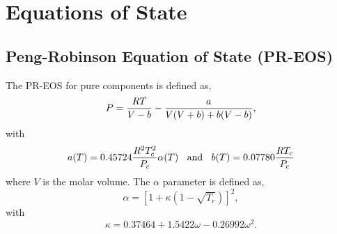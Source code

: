
\chapter{Equations of State}\label{Chapter:EOSPR}

\section{Peng-Robinson Equation of State (PR-EOS)}\label{Chapter:EOSPR:Section:PR}
The PR-EOS for pure components is defined as,
   \begin{equation}
      P = \displaystyle\frac{RT}{V-b} - \displaystyle\frac{a}{V(V+b) + b(V-b)}\label{Chapter:EOSPR:Section:PR:Eqn:PR},
   \end{equation}
with
   \begin{displaymath}
      a(T)=0.45724\displaystyle\frac{R^{2}T_{c}^{2}}{P_{c}}\alpha(T)\;\;\text{ and }\;\;b(T) = 0.07780\displaystyle\frac{RT_{c}}{P_{c}}
   \end{displaymath}
where $V$ is the molar volume. The $\alpha$ parameter is defined as,
   \begin{equation}
         \alpha = \left[1 + \kappa\left(1 - \sqrt{T_{r}}\right)\right]^{2},
   \end{equation}
with
   \begin{equation}
         \kappa = 0.37464 + 1.5422\omega - 0.26992\omega^{2}.
   \end{equation}
